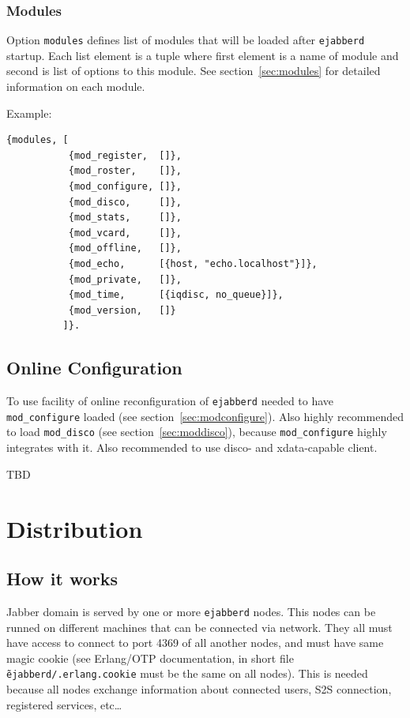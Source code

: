 \documentclass[10pt]{article}
\newcommand{\ejabberd}{\texttt{ejabberd}}
\newcommand{\Jabber}{Jabber}
\newcommand{\modconfigure}{\texttt{mod\_configure}}
\newcommand{\moddisco}{\texttt{mod\_disco}}
\begin{document}
\subsubsection{Modules}
\label{sec:configmodules}

Option \texttt{modules} defines list of modules that will be loaded after
\ejabberd{} startup.  Each list element is a tuple where first element is a
name of module and second is list of options to this module.  See
section~\ref{sec:modules} for detailed information on each module.

Example:
\begin{verbatim}
{modules, [
           {mod_register,  []},
           {mod_roster,    []},
           {mod_configure, []},
           {mod_disco,     []},
           {mod_stats,     []},
           {mod_vcard,     []},
           {mod_offline,   []},
           {mod_echo,      [{host, "echo.localhost"}]},
           {mod_private,   []},
           {mod_time,      [{iqdisc, no_queue}]},
           {mod_version,   []}
          ]}.
\end{verbatim}


\subsection{Online Configuration}
\label{sec:onlineconfig}

To use facility of online reconfiguration of \ejabberd{} needed to have
\modconfigure{} loaded (see section~\ref{sec:modconfigure}).  Also highly
recommended to load \moddisco{} (see section~\ref{sec:moddisco}), because
\modconfigure{} highly integrates with it.  Also recommended to use
disco- and xdata-capable client.

TBD

\section{Distribution}
\label{sec:distribution}


\subsection{How it works}
\label{sec:howitworks}

\Jabber{} domain is served by one or more \ejabberd{} nodes.  This nodes can be
runned on different machines that can be connected via network.  They all must
have access to connect to port 4369 of all another nodes, and must have same
magic cookie (see Erlang/OTP documentation, in short file
\texttt{\~ejabberd/.erlang.cookie} must be the same on all nodes).  This is
needed because all nodes exchange information about connected users, S2S
connection, registered services, etc\ldots
\end{document}
